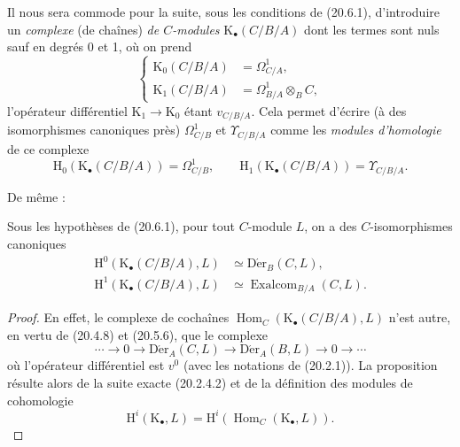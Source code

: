 \begin{env}[20.6.5]
\label{0.20.6.5-fr}
Il nous sera commode pour la suite, sous les conditions de (20.6.1),
d'introduire un \emph{complexe} (de chaînes) \emph{de $C$-modules}
$\mathrm{K}_\bullet(C/B/A)$ dont les termes sont nuls sauf en degrés 0
et 1, où on prend
\begin{equation}
\tag{20.6.5.1}
\label{0.20.6.5.1-fr}
\left\{
\begin{aligned}
  \mathrm{K}_0(C/B/A)&=\Omega^1_{C/A},\\
  \mathrm{K}_1(C/B/A)&=\Omega^1_{B/A}\otimes_B C,
\end{aligned}
\right.
\end{equation}
l'opérateur différentiel $\mathrm{K}_1\to\mathrm{K}_0$ étant
$v_{C/B/A}$. Cela permet d'écrire (à des isomorphismes canoniques près)
$\Omega^1_{C/B}$ et $\Upsilon_{C/B/A}$ comme les \emph{modules
d'homologie} de ce complexe
\begin{equation}
\tag{20.6.5.2}
\label{0.20.6.5.2-fr}
  \mathrm{H}_0(\mathrm{K}_\bullet(C/B/A))=\Omega^1_{C/B},\qquad
  \mathrm{H}_1(\mathrm{K}_\bullet(C/B/A))=\Upsilon_{C/B/A}.
\end{equation}
\end{env}

De même :
\begin{proposition}[20.6.6]
\label{0.20.6.6-fr}
Sous les hypothèses de (20.6.1), pour tout $C$-module $L$, on a des
$C$-isomorphismes canoniques
\begin{align}
\tag{20.6.6.1}
\label{0.20.6.6.1-fr}
  \mathrm{H}^0(\mathrm{K}_\bullet(C/B/A),L)&\simeq\operatorname{D\acute{e}r}_B(C,L),\\
\tag{20.6.6.2}
\label{0.20.6.6.2-fr}
  \mathrm{H}^1(\mathrm{K}_\bullet(C/B/A),L)&\simeq
  \operatorname{Exalcom}_{B/A}(C,L).
\end{align}
\end{proposition}

\begin{proof}
En effet, le complexe de cochaînes
$\operatorname{Hom}_C(\mathrm{K}_\bullet(C/B/A),L)$ n'est autre, en vertu de (20.4.8)
et (20.5.6), que le complexe
\[
  \cdots\longrightarrow0\longrightarrow\operatorname{D\acute{e}r}_A(C,L)
  \longrightarrow\operatorname{D\acute{e}r}_A(B,L)\longrightarrow0\longrightarrow\cdots
\]
où l'opérateur différentiel est $v^0$ (avec les notations de (20.2.1)).
La proposition résulte alors de la suite exacte (20.2.4.2) et de la
définition des modules de cohomologie
\begin{equation}
\tag{20.6.6.3}
\label{0.20.6.6.3-fr}
  \mathrm{H}^i(\mathrm{K}_\bullet,L)=
  \mathrm{H}^i(\operatorname{Hom}_C(\mathrm{K}_\bullet,L)).
\end{equation}
\end{proof}

